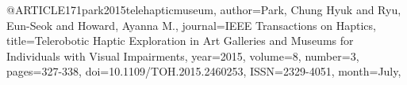 @ARTICLE{171park2015telehapticmuseum,
author={Park, Chung Hyuk and Ryu, Eun-Seok and Howard, Ayanna M.},
journal={IEEE Transactions on Haptics}, 
title={Telerobotic Haptic Exploration in Art Galleries and Museums for Individuals with Visual Impairments}, 
year={2015},
volume={8},
number={3},
pages={327-338},
doi={10.1109/TOH.2015.2460253},
ISSN={2329-4051},
month={July},}